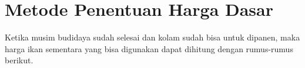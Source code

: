 \section{Metode Penentuan Harga Dasar}

Ketika musim budidaya sudah selesai dan kolam sudah bisa untuk dipanen, maka harga ikan sementara yang bisa digunakan dapat dihitung dengan rumus-rumus berikut.




